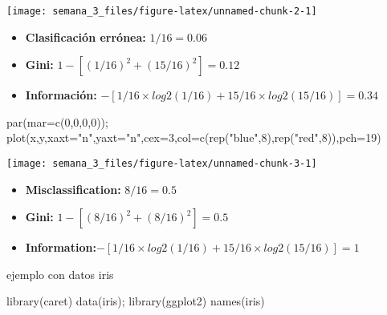 \documentclass[
]{article}
\newenvironment{Shaded}{\begin{snugshade}}{\end{snugshade}}
\newcommand{\AttributeTok}[1]{\textcolor[rgb]{0.77,0.63,0.00}{#1}}
\newcommand{\DecValTok}[1]{\textcolor[rgb]{0.00,0.00,0.81}{#1}}
\newcommand{\FunctionTok}[1]{\textcolor[rgb]{0.00,0.00,0.00}{#1}}
\newcommand{\NormalTok}[1]{#1}
\newcommand{\StringTok}[1]{\textcolor[rgb]{0.31,0.60,0.02}{#1}}
\providecommand{\tightlist}{%
  \setlength{\itemsep}{0pt}\setlength{\parskip}{0pt}}
\begin{document}
\begin{center}\texttt{[image: semana\_3\_files/figure-latex/unnamed-chunk-2-1]} \end{center}

\begin{itemize}
\tightlist
\item
  \textbf{Clasificación errónea:} \(1/16 = 0.06\)
\item
  \textbf{Gini:} \(1 - [(1/16) ^ 2 + (15/16) ^ 2] = 0.12\)
\item
  \textbf{Información:}
  \(- [1/16 \times log2 (1/16) + 15/16 \times log2 (15/16)] = 0.34\)
\end{itemize}

\begin{Shaded}
\begin{Highlighting}[]
\FunctionTok{par}\NormalTok{(}\AttributeTok{mar=}\FunctionTok{c}\NormalTok{(}\DecValTok{0}\NormalTok{,}\DecValTok{0}\NormalTok{,}\DecValTok{0}\NormalTok{,}\DecValTok{0}\NormalTok{)); }
\FunctionTok{plot}\NormalTok{(x,y,}\AttributeTok{xaxt=}\StringTok{"n"}\NormalTok{,}\AttributeTok{yaxt=}\StringTok{"n"}\NormalTok{,}\AttributeTok{cex=}\DecValTok{3}\NormalTok{,}\AttributeTok{col=}\FunctionTok{c}\NormalTok{(}\FunctionTok{rep}\NormalTok{(}\StringTok{"blue"}\NormalTok{,}\DecValTok{8}\NormalTok{),}\FunctionTok{rep}\NormalTok{(}\StringTok{"red"}\NormalTok{,}\DecValTok{8}\NormalTok{)),}\AttributeTok{pch=}\DecValTok{19}\NormalTok{)}
\end{Highlighting}
\end{Shaded}

\begin{center}\texttt{[image: semana\_3\_files/figure-latex/unnamed-chunk-3-1]} \end{center}

\begin{itemize}
\tightlist
\item
  \textbf{Misclassification:} \(8/16 = 0.5\)
\item
  \textbf{Gini:} \(1 - [(8/16)^2 + (8/16)^2] = 0.5\)
\item
  \textbf{Information:}\(-[1/16 \times log2(1/16) + 15/16 \times log2(15/16)] = 1\)
\end{itemize}

ejemplo con datos iris

\begin{Shaded}
\begin{Highlighting}[]
\FunctionTok{library}\NormalTok{(caret)}
\FunctionTok{data}\NormalTok{(iris); }\FunctionTok{library}\NormalTok{(ggplot2)}
\FunctionTok{names}\NormalTok{(iris)}
\end{Highlighting}
\end{Shaded}
\end{document}
